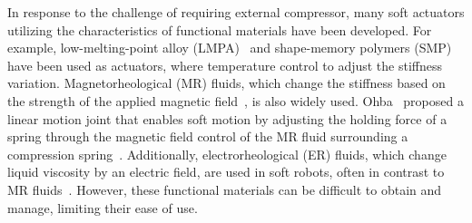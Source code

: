 In response to the challenge of requiring external compressor, many soft actuators utilizing the characteristics of functional materials have been developed. 
For example, low-melting-point alloy (LMPA)~\cite{hao2018eutectic} and shape-memory polymers (SMP)~\cite{zhang2019fast} have been used as actuators, where temperature control to adjust the stiffness variation.
Magnetorheological (MR) fluids, which change the stiffness based on the strength of the applied magnetic field~\cite{de2011magnetorheological}, is also widely used.  
Ohba \etal\ proposed a linear motion joint that enables soft motion by adjusting the holding force of a spring through the magnetic field control of the MR fluid surrounding a compression spring~\cite{ohba2012elastic}.
Additionally, electrorheological (ER) fluids, which change liquid viscosity by an electric field, are used in soft robots, often in contrast to MR fluids~\cite{electrorheological}. 
However, these functional materials can be difficult to obtain and manage, limiting their ease of use.



